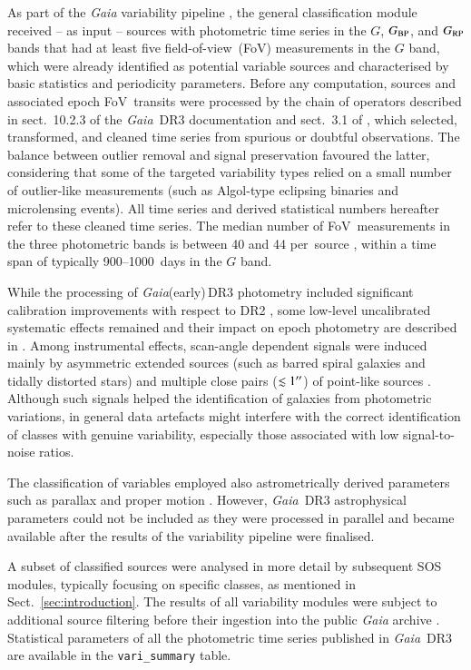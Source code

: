 \documentclass[longauth]{aa}
\def\gaia{\textit{Gaia}\xspace}
\def\gdr3{\textit{Gaia}~DR3\xspace}
\def\g{$G$\xspace}
\def\bp{$G_{\rm BP}$\xspace}
\def\rp{$G_{\rm RP}$\xspace}
\begin{document}
As part of the \gaia variability pipeline \citep{DR3-DPACP-162}, the general classification module received -- as input -- sources with photometric time series in the \g, \bp, and \rp bands \citep{2021A&A...649A...3R} that had at least five field-of-view~(FoV) measurements in the \g band, which were already identified as potential variable sources and characterised by basic statistics and periodicity parameters.
Before any computation, sources and associated epoch FoV~transits were processed by the chain of operators described in sect.~10.2.3 of the \gdr3 documentation \citep{2022gdr3.reptE..10R} and sect.~3.1 of \citet{DR3-DPACP-162}, which selected, transformed, and cleaned time series from spurious or doubtful observations. The balance between outlier removal and signal preservation favoured the latter, considering that some of the targeted variability types relied on a small number of outlier-like measurements (such as Algol-type eclipsing binaries and microlensing events). 
All time series and derived statistical numbers hereafter refer to these cleaned time series.
The median number of FoV~measurements in the three photometric bands is between 40 and 44 per~source \citep{DR3-DPACP-162}, within a time span of typically 900--1000~days in the \g band.

While the processing of \gaia (early)\,DR3 photometry included significant calibration improvements with respect to DR2 \citep{2021A&A...649A...3R}, some low-level uncalibrated systematic effects remained and their impact on epoch photometry are described in \citet{DR3-DPACP-142}.
Among instrumental effects, scan-angle dependent signals were induced mainly by asymmetric extended sources (such as barred spiral galaxies and tidally distorted stars) and multiple close pairs ($\lesssim 1^{\prime\prime}$) of point-like sources \citep{DR3-DPACP-164}. 
Although such signals helped the identification of galaxies from photometric variations, in general data artefacts might interfere with the correct identification of classes with genuine variability, especially those associated with low signal-to-noise ratios.

The classification of variables employed also astrometrically derived parameters such as parallax and proper motion \citep{2021A&A...649A...2L}. However, \gdr3 astrophysical parameters \citep{2022arXiv220606138A,DR3-AP1,DR3-AP3,DR3-AP2} could not be included as they were processed in parallel and became available after the results of the variability pipeline were finalised.

A subset of classified sources were analysed in more detail by subsequent SOS modules, typically focusing on specific classes, as mentioned in Sect.~\ref{sec:introduction}. The results of all variability modules were subject to additional source filtering before their ingestion into the public \gaia archive \citep{DR3-CU9}.
Statistical parameters of all the photometric time series published in \gdr3 are available in the \texttt{vari\_summary} table.
\end{document}
